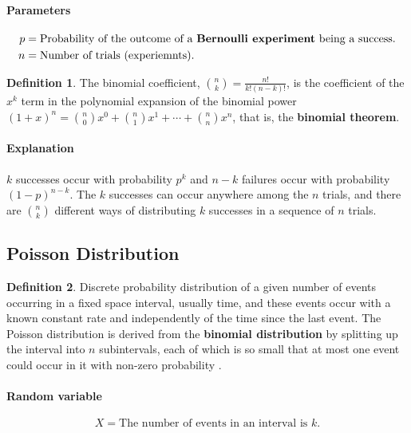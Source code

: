 \documentclass[12pt]{article}
\theoremstyle{plain}
\theoremstyle{definition}
\newtheorem{definition}{Definition}
\theoremstyle{remark}
\begin{document}
\paragraph{Parameters}
\begin{align*}
  p & = \text{Probability of the outcome of a \textbf{Bernoulli experiment}
    being a success.} \\
  n & = \text{Number of trials (experiemnts).}
\end{align*}

\begin{definition}
  The binomial coefficient, $\binom{n}{k} = \frac{n!}{k!(n-k)!}$, is the
  coefficient of the $x^k$ term in the polynomial expansion of the binomial
  power
  $(1+x)^n = \binom{n}{0}x^0 + \binom{n}{1}x^1 + \cdots + \binom{n}{n}x^n$,
  that is, the \textbf{binomial theorem}.
\end{definition}

\paragraph{Explanation}
$k$ successes occur with probability $p^k$ and $n-k$ failures occur with
probability $(1-p)^{n-k}$.
The $k$ successes can occur anywhere among the $n$ trials, and there are
$\binom{n}{k}$ different ways of distributing $k$ successes in a sequence of
$n$ trials.

\subsection{Poisson Distribution}

\begin{definition}
  Discrete probability distribution of a given number of events occurring in a
  fixed space interval, usually time, and these events occur with a known
  constant rate and independently of the time since the last event.
  The Poisson distribution is derived from the \textbf{binomial distribution}
  by splitting up the interval into $n$ subintervals, each of which is so small
  that at most one event could occur in it with non-zero probability
  \citep{wacmensch08}.
\end{definition}

\paragraph{Random variable}
\begin{equation*}
  X = \text{The number of events in an interval is $k$.}
\end{equation*}
\end{document}
